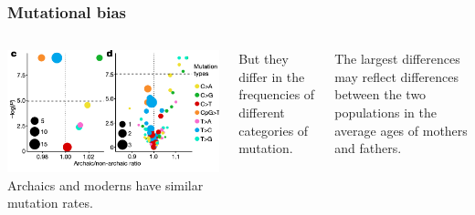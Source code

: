 \documentclass[pdftex,12pt]{beamer}
\begin{document}
\begin{frame}
  \frametitle{Mutational bias}
  \begin{columns}
    \includegraphics[width=\linewidth]{muttype.png}
    \raggedleft
    Archaics and moderns have similar mutation rates.

    \bigskip

    But they differ in the frequencies of different categories of
    mutation.

    \bigskip

    The largest differences may reflect differences between the two
    populations in the average ages of mothers and fathers.
  \end{columns}

\end{frame}
\end{document}
